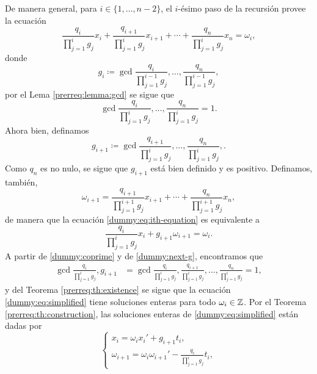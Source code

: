 De manera general, para $i \in \lbrace 1, \ldots, n - 2 \rbrace$, el $i$-ésimo paso de la recursión
provee la ecuación
\begin{equation}
	\label{dummy:eq:ith-equation}
	\frac{q_i}{\prod_{j=1}^{i}g_j}x_i
	+ \frac{q_{i+1}}{\prod_{j=1}^{i}g_j}x_{i+1}
	+ \cdots
	+ \frac{q_{n}}{\prod_{j=1}^{i}g_j}x_n
	= \omega_i,
\end{equation}
donde
\begin{equation*}
	g_i \coloneq \gcd{\frac{q_i}{\prod_{j=1}^{i-1}g_j}, \ldots, \frac{q_n}{\prod_{j=1}^{i-1}g_j}},
\end{equation*}
por el Lema \ref{prerreq:lemma:gcd} se sigue que
\begin{equation}
	\label{dummy:coprime}
	\gcd{\frac{q_i}{\prod_{j=1}^{i}g_j}, \ldots, \frac{q_n}{\prod_{j=1}^{i}g_j}} = 1.
\end{equation}
Ahora bien, definamos
\begin{equation}
	\label{dummy:next-g}
	g_{i + 1} \coloneq \gcd{
		\frac{q_{i+1}}{\prod_{j=1}^{i}g_j},
		\ldots,
		\frac{q_{n}}{\prod_{j=1}^{i}g_j},
	}.
\end{equation}
Como $q_n$ es no nulo, se sigue que $g_{i + 1}$ está bien definido y es positivo. Definamos,
también,
\begin{equation*}
	\omega_{i+1} =
	\frac{q_{i+1}}{\prod_{j=1}^{i + 1}g_j}x_{i+1}
	+ \cdots +
	\frac{q_{n}}{\prod_{j=1}^{i + 1}g_j}x_{n},
\end{equation*}
de manera que la ecuación \eqref{dummy:eq:ith-equation} es equivalente a
\begin{equation}
	\label{dummy:eq:simplified}
	\frac{q_i}{\prod_{j=1}^{i}g_j}x_i + g_{i+1}\omega_{i+1} = \omega_i.
\end{equation}
A partir de \eqref{dummy:coprime} y de \eqref{dummy:next-g}, encontramos que
\begin{align*}
	\gcd{
		\frac{q_i}{\prod_{j=1}^{i}g_j},
		g_{i+1}
	}
	&=
	\gcd{
		\frac{q_i}{\prod_{j=1}^{i}g_j},
		\frac{q_{i+1}}{\prod_{j=1}^{i}g_j},
		\ldots,
		\frac{q_n}{\prod_{j=1}^{i}g_j}
	} = 1,
\end{align*}
y del Teorema \ref{prerreq:th:existence} se sigue que la ecuación \eqref{dummy:eq:simplified}
tiene soluciones enteras para todo $\omega_i \in \mathbb{Z}$. Por el Teorema \ref{prerreq:th:construction},
las soluciones enteras de \eqref{dummy:eq:simplified} están dadas por
\begin{equation}
	\label{eq:recurrence}
	\begin{cases}
		x_i = \omega_ix_i' + g_{i + 1}t_i, \\
		\omega_{i + 1} = \omega_i\omega_{i + 1}' - \frac{q_i}{\prod_{j=1}^{i}g_j}t_i,
	\end{cases}
\end{equation}
